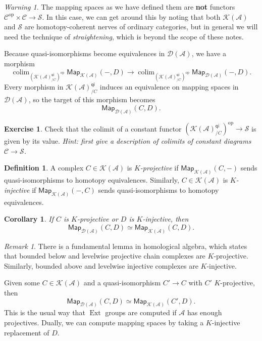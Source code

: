 \documentclass[10pt, oneside]{memoir}
\newtheorem{cor}[thm]{Corollary}
\theoremstyle{definition}
\newtheorem{defn}[thm]{Definition}
\newtheorem{exer}[thm]{Exercise}
\theoremstyle{remark}
\newtheorem{rmk}[thm]{Remark}
\newtheorem{warn}[thm]{Warning}
\theoremstyle{plain}
\theoremstyle{definition}
\theoremstyle{remark}
\newcommand{\mc}[1]{\mathcal{#1}}
\newcommand{\ms}[1]{\mathsf{#1}}
\newcommand{\1}{\mathbf{1}}
\newcommand{\2}{\mathbf{2}}
\newcommand{\3}{\mathbf{3}}
\DeclareMathOperator{\Ext}{Ext}
\DeclareMathOperator{\op}{op}
\DeclareMathOperator*{\colim}{colim}
\begin{document}
\begin{warn}
    The mapping spaces as we have defined them are \textbf{not} functors $\mc{C}^{\op} \times \mc{C} \to \mc{S}$. In this case, we can get around this by noting that both $\mc{K}(\mc{A})$ and $\mc{S}$ are homotopy-coherent nerves of ordinary categories, but in general we will need the technique of \textit{straightening}, which is beyond the scope of these notes.
\end{warn}

Because quasi-isomorphisms become equivalences in $\mc{D}(\mc{A})$, we have a morphism
\[ \colim_{(\mc{K}(\mc{A})_{/C}^{\ms{qi}})^{\op}} \ms{Map}_{\mc{K}(\mc{A})}(-, D) \to \colim_{(\mc{K}(\mc{A})_{/C}^{\ms{qi}})^{\op}} \ms{Map}_{\mc{D}(\mc{A})}(-, D). \]
Every morphism in $\mc{K}(\mc{A})_{/C}^{\ms{qi}}$ induces an equivalence on mapping spaces in $\mc{D}(\mc{A})$, so the target of this morphism becomes
\[ \ms{Map}_{\mc{D}(\mc{A})}(C, D). \]

\begin{exer}
    Check that the colimit of a constant functor $(\mc{K}(\mc{A})_{/C}^{\ms{qi}})^{\op} \to \mc{S}$ is given by its value. \textit{Hint: first give a description of colimits of constant diagrams $\mc{C} \to \mc{S}$.}
\end{exer}

\begin{defn}
    A complex $C \in \mc{K}(\mc{A})$ is \textit{$K$-projective} if $\ms{Map}_{\mc{K}(\mc{A})}(C, -)$ sends quasi-isomorphisms to homotopy equivalences. Similarly, $C \in \mc{K}(\mc{A})$ is \textit{$K$-injective} if $\ms{Map}_{\mc{K}(\mc{A})}(-, C)$ sends quasi-isomorphisms to homotopy equivalences.
\end{defn}

\begin{cor}
    If $C$ is $K$-projective or $D$ is $K$-injective, then 
    \[ \ms{Map}_{\mc{D}(\mc{A})} (C, D) \simeq \ms{Map}_{\mc{K}(\mc{A})}(C, D). \]
\end{cor}

\begin{rmk}
    There is a fundamental lemma in homological algebra, which states that bounded below and levelwise projective chain complexes are $K$-projective. Similarly, bounded above and levelwise injective complexes are $K$-injective.
\end{rmk}

Given some $C \in \mc{K}(\mc{A})$ and a quasi-isomorphism $C' \to C$ with $C'$ $K$-projective, then
\[ \ms{Map}_{\mc{D}(\mc{A})} (C, D) \simeq \ms{Map}_{\mc{K}(\mc{A})} (C', D). \]
This is the usual way that $\Ext$ groups are computed if $\mc{A}$ has enough projectives. Dually, we can compute mapping spaces by taking a $K$-injective replacement of $D$.
\end{document}
